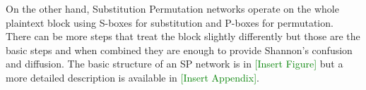 \documentclass[12pt,twoside,a4paper]{report}
\begin{document}
    
    On the other hand, Substitution Permutation networks operate on the whole plaintext block using S-boxes for substitution and P-boxes for permutation. There can be more steps that treat the block slightly differently but those are the basic steps and when combined they are enough to provide Shannon's confusion and diffusion\cite{Shannon1949}. The basic structure of an SP network is in \textcolor{green}{[Insert Figure]} but a more detailed description is available in \textcolor{green}{[Insert Appendix]}.
    
    
    
\end{document}
